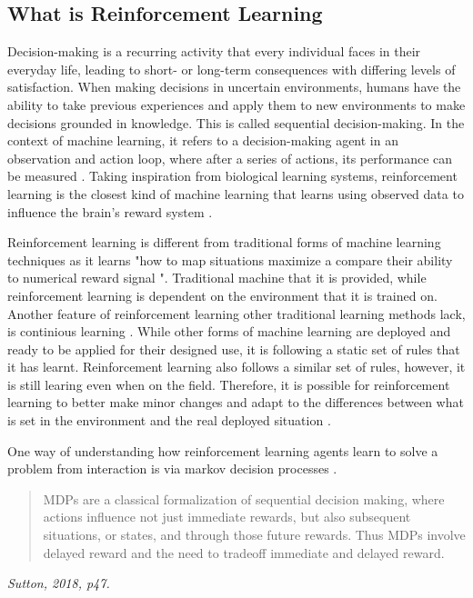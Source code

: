 \subsection{What is Reinforcement Learning}

Decision-making is a recurring activity that every individual faces in their everyday life, leading to short- or long-term consequences with differing levels of satisfaction. When making decisions in uncertain environments, humans have the ability to take previous experiences and apply them to new environments to make decisions grounded in knowledge. This is called sequential decision-making. In the context of machine learning, it refers to a decision-making agent in an observation and action loop, where after a series of actions, its performance can be measured \cite{francon2020effective}. Taking inspiration from biological learning systems, reinforcement learning is the closest kind of machine learning that learns using observed data to influence the brain's reward system \cite{Sutton1}. 

Reinforcement learning is different from traditional forms of machine learning techniques as it learns "how to map situations maximize a compare their ability to numerical reward signal \cite{Sutton1}". Traditional machine that     it is provided, while reinforcement learning is dependent on the environment that it is trained on. Another feature of reinforcement learning other traditional learning methods lack, is continious learning \cite{sreenivas2022safe}. While other forms of machine learning are deployed and ready to be applied for their designed use, it is following a static set of rules that it has learnt. Reinforcement learning also follows a similar set of rules, however, it is still learing even when on the field. Therefore, it is possible for reinforcement learning to better make minor changes and adapt to the differences between what is set in the environment and the real deployed situation \cite{sreenivas2022safe}.

One way of understanding how reinforcement learning agents learn to solve a problem from interaction is via markov decision processes \cite{Sutton1}.

\begin{quote}
MDPs are a classical formalization of sequential decision making,
where actions influence not just immediate rewards, but also subsequent situations, or
states, and through those future rewards. Thus MDPs involve delayed reward and the
need to tradeoff immediate and delayed reward.
\end{quote}
\hspace*{\fill} \textit{Sutton, 2018, p47.}

